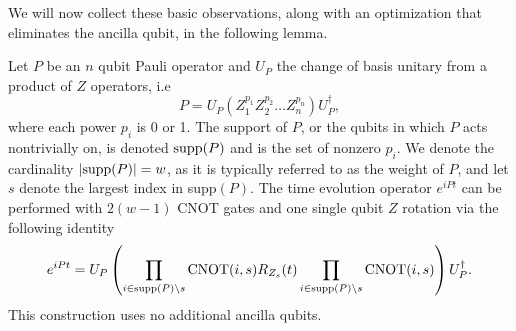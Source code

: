 We will now collect these basic observations, along with an optimization that eliminates the ancilla qubit, in the following lemma.
\begin{lemma}
    Let $P$ be an $n$ qubit Pauli operator and $U_P$ the change of basis unitary from a product of $Z$ operators, i.e 
    \begin{equation}
        P = U_P \left(Z_1^{p_1} Z_2^{p_2} \ldots Z_n^{p_n} \right) U_P^\dagger,
    \end{equation}
    where each power $p_i$ is 0 or 1. The support of $P$, or the qubits in which $P$ acts nontrivially on, is denoted ${\rm supp}(P)$ and is the set of nonzero $p_i$. We denote the cardinality $|{\rm supp}(P)| = w$, as it is typically referred to as the weight of $P$, and let $s$ denote the largest index in supp$(P)$. The time evolution operator $e^{i P t}$ can be performed with $2(w-1)$ CNOT gates and one single qubit $Z$ rotation via the following identity
    \begin{equation}
        e^{i P t} = U_P \left(\prod_{i \in {\rm supp}(P) \setminus s} {\rm CNOT}(i, s) R_{Z_s}(t) \prod_{i \in {\rm supp}(P) \setminus s} {\rm CNOT}(i, s) \right) U_P^\dagger.
    \end{equation}
    This construction uses no additional ancilla qubits.
\end{lemma}
